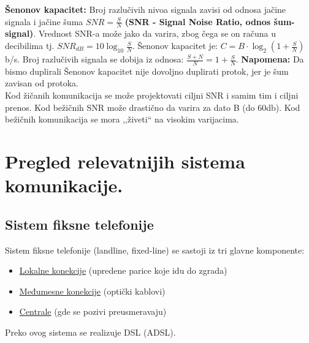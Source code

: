 \documentclass[a4paper]{article}
\begin{document}
    \textbf{Šenonov kapacitet:} Broj razlučivih nivoa signala zavisi od odnosa jačine signala i 
    jačine šuma $SNR = \frac{S}{N}$ \textbf{(SNR - Signal Noise Ratio, odnos šum-signal)}. 
    Vrednost SNR-a može jako da varira, zbog čega se on računa u decibilima tj. $SNR_{dB} = 10 \log_{10}{\frac{S}{N}}$. 
    Šenonov kapacitet je: $C = B\cdot \log_2{(1+\frac{S}{N})}$ b/s. Broj razlučivih signala se dobija 
    iz odnosa: $\frac{S+N}{N}=1+\frac{S}{N}$. \textbf{Napomena:} Da bismo duplirali Šenonov kapacitet nije
    dovoljno duplirati protok, jer je šum zavisan od protoka. \\
    \indent Kod žičanih komunikacija se može projektovati ciljni SNR i samim tim i ciljni prenos. Kod
    bežičnih SNR može drastično da varira za dato B (do 60db). Kod bežičnih komunikacija se mora
    ,,živeti`` na visokim varijacima. 

\section{Pregled relevatnijih sistema komunikacije.}
    \subsection{Sistem fiksne telefonije}
        \noindent Sistem fiksne telefonije (landline, fixed-line) se sastoji iz tri glavne komponente:
        \begin{itemize}
            \item \underline{Lokalne konekcije} (upredene parice koje idu do zgrada)
            \item \underline{Međumesne konekcije} (optički kablovi)
            \item \underline{Centrale} (gde se pozivi preusmeravaju)
        \end{itemize}
        Preko ovog sistema se realizuje DSL (ADSL).
\end{document}
